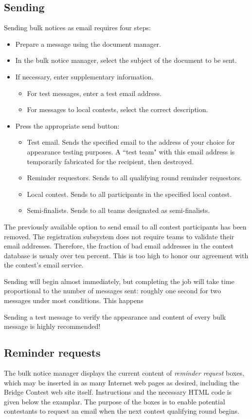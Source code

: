 \documentclass[11pt,letterpaper]{refart}
\def\ui#1{\textsf{#1}}
\begin{document}
\subsection{Sending}
Sending bulk notices as email requires four steps:
\begin{itemize}
\item Prepare a message using the document manager.
\item In the bulk notice manager, select the subject of the document to be sent.
\item If necessary, enter supplementary information. 
  \begin{itemize}
  \item For test messages, enter a test email address.
  \item For messages to local contests, select the correct description.
  \end{itemize}
\item Press the appropriate send button:   
  \begin{itemize}
  \item \ui{Test email}. Sends the specified email to the address of your choice
    for appearance testing purposes. A ``test team" with this email address
    is temporarily fabricated for the recipient, then destroyed.
  \item \ui{Reminder requestors}. Sends to all qualifying round reminder requestors.
  \item \ui{Local contest}. Sends to all participants in the specified local contest.
  \item \ui{Semi-finalists}. Sends to all teams designated as semi-finalists.
  \end{itemize}
\end{itemize}
The previously available option to send email to all contest participants has been
removed. The registration subsystem does not require teams to validate their email
addresses. Therefore, the fraction of bad email addresses in the contest database
is usualy over ten percent. This is too high to honor our agreement with the
contest's email service.

Sending will begin almost immediately, but completing the job will take
time proportional to the number of messages sent: roughly one second for
two messages under most conditions. This happens

Sending a test message to verify the appearance and content of every
bulk message is highly recommended!

\subsection{Reminder requests}
The bulk notice manager displays the current content of \emph{reminder
  request} boxes, which may be inserted in as many Internet web pages
as desired, including the Bridge Contest web site itself.
Instructions and the necessary HTML code is given below the
examplar. The purpose of the boxes is to enable potential contestants
to request an email when the next contest qualifying round begins.
\end{document}
